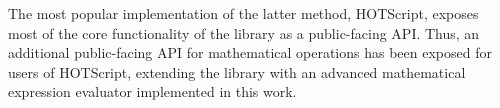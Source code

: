 The most popular implementation of the latter method, HOTScript, exposes most of the core functionality of the library as a public-facing API. Thus, an additional public-facing API for mathematical operations has been exposed for users of HOTScript, extending the library with an advanced mathematical expression evaluator implemented in this work.
